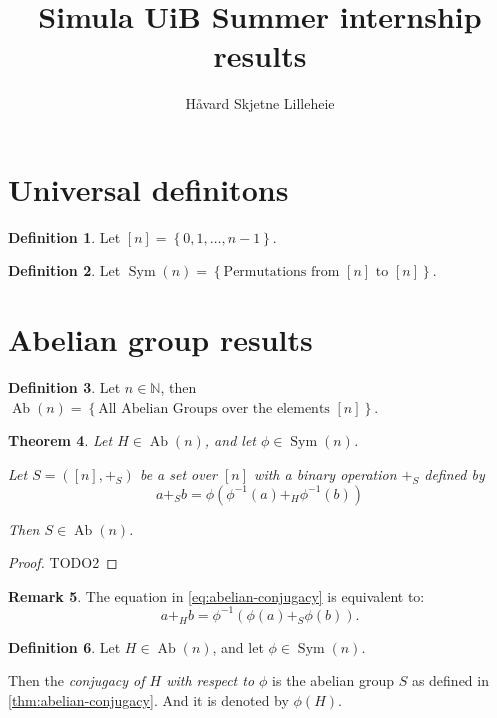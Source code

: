 \documentclass[a4paper, 12pt, english]{article}
\title{Simula UiB Summer internship results}
\author{Håvard Skjetne Lilleheie}
\theoremstyle{plain}
\newtheorem{theorem}{Theorem}[section]
\theoremstyle{definition}
\newtheorem{definition}[theorem]{Definition}
\newtheorem{remark}[theorem]{Remark}
\newcommand{\Nb}{\mathbb{N}}
\newcommand{\set}[1]{ \left\{ #1 \right\} } %
\newcommand{\tuple}[1]{ \left( #1 \right) } %
\DeclareMathOperator{\Ab}{Ab}
\DeclareMathOperator{\Sym}{Sym}
\begin{document}
\maketitle

\section{Universal definitons}

\begin{definition}
    Let \( [n] = \set{0, 1, \dots, n-1} \).
\end{definition}

\begin{definition}
    Let \( \Sym(n) = \set{\text{Permutations from } [n] \text{ to } [n]} \).
\end{definition}

\section{Abelian group results}

\begin{definition}
    Let \( n \in \Nb \), then \( \Ab(n) = \set{ \text{All Abelian Groups over the elements } [n]} \).
\end{definition}

\begin{theorem} \label{thm:abelian-conjugacy}
    Let \( H \in \Ab(n) \), and let \( \phi \in \Sym(n) \).

    Let \( S = \tuple{[n], +_S} \) be a set over \( [n] \) with a binary operation \( +_S \) defined by
    \begin{equation} \label{eq:abelian-conjugacy}
        a +_S b = \phi(\phi^{-1}(a) +_H \phi^{-1}(b))
    \end{equation}
    
    Then \( S \in \Ab(n) \).
\end{theorem}
\begin{proof}
    TODO2
\end{proof}

\begin{remark}
    The equation in \autoref{eq:abelian-conjugacy} is equivalent to:
    \[
        a +_H b = \phi^{-1}(\phi(a) +_S \phi(b)).
    \]
\end{remark}

\begin{definition} \label{def:abelian-conjugacy}
    Let \( H \in \Ab(n) \), and let \( \phi \in \Sym(n) \).

    Then the \emph{conjugacy of \( H \) with respect to \( \phi \)} is the abelian group \( S \) as defined in \autoref{thm:abelian-conjugacy}. And it is denoted by \( \phi(H) \).
\end{definition}
\end{document}
